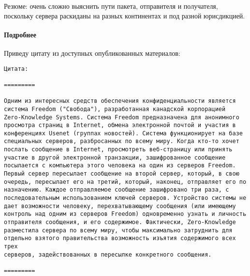Резюме: очень сложно выяснить пути пакета, отправителя и получателя,
поскольку сервера раскиданы на разных континентах и под разной
юрисдикцией.


\paragraph{Подробнее}

Приведу цитату из доступных опубликованных материалов:

\begin{verbatim}
Цитата:

=========

Одним из интересных средств обеспечения конфиденциальности является
система Freedom ("Свобода"), разработанная канадской корпорацией
Zero-Knowledge Systems. Система Freedom предназначена для анонимного
просмотра страниц в Internet, обмена электронной почтой и участия в
конференциях Usenet (группах новостей). Система функционирует на базе
специальных серверов, разбросанных по всему миру. Когда кто-то хочет
послать сообщение в Internet, просмотреть веб-страницу или принять
участие в другой электронной транзакции, зашифрованное сообщение
посылается с компьютера этого человека на один из серверов Freedom.
Первый сервер пересылает сообщение на второй сервер, который, в свою
очередь, пересылает его на третий, который, наконец, отправляет его по
назначению. Каждое отправляемое сообщение зашифровано три раза, с
последовательным использованием ключей серверов. Устройство системы не
дает возможности человеку, перехватывающему сообщения (или имеющему
контроль над одним из серверов Freedom) одновременно узнать и личность
отправителя сообщения, и его содержимое. Фактически, Zero-Knowledge
разместила сервера по всему миру, чтобы максимально затруднить для
отдельно взятого правительства возможность изъятия содержимого всех трех
серверов, задействованных в пересылке конкретного сообщения.

=========
\end{verbatim}


